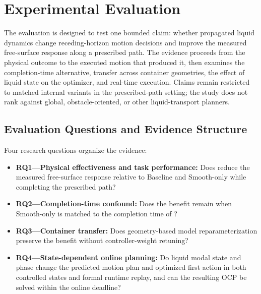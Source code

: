 \section{Experimental Evaluation}
\label{sec:experiments}

The evaluation is designed to test one bounded claim: whether propagated liquid
dynamics change receding-horizon motion decisions and improve the measured
free-surface response along a prescribed path. The evidence proceeds from the
physical outcome to the executed motion that produced it, then examines the
completion-time alternative, transfer across container geometries, the effect
of liquid state on the optimizer, and real-time execution. Claims remain
restricted to matched internal \MPCC{} variants in the prescribed-path setting;
the study does not rank \SMPCC{} against global, obstacle-oriented, or other
liquid-transport planners.

\subsection{Evaluation Questions and Evidence Structure}

Four research questions organize the evidence:
\begin{itemize}
  \item \textbf{RQ1---Physical effectiveness and task performance:} Does
  \SMPCC{} reduce the measured free-surface response relative to Baseline and
  Smooth-only \MPCC{} while completing the prescribed path?
  \item \textbf{RQ2---Completion-time confound:} Does the benefit remain when
  Smooth-only \MPCC{} is matched to the completion time of \SMPCC{}?
  \item \textbf{RQ3---Container transfer:} Does geometry-based model
  reparameterization preserve the benefit without controller-weight retuning?
  \item \textbf{RQ4---State-dependent online planning:} Do liquid modal state
  and phase change the predicted motion plan and optimized first action in both
  controlled states and formal runtime replay, and can the resulting OCP be
  solved within the online deadline?
\end{itemize}


